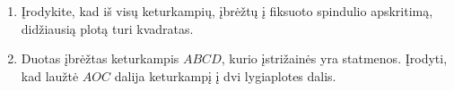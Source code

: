 \begin{enumerate}
\item Įrodykite, kad iš visų keturkampių, įbrėžtų į fiksuoto
  spindulio apskritimą, didžiausią plotą turi kvadratas.

\item Duotas įbrėžtas keturkampis $ABCD$, kurio įstrižainės
  yra statmenos. Įrodyti, kad laužtė $AOC$ dalija keturkampį
  į dvi lygiaplotes dalis.


\end{enumerate}
